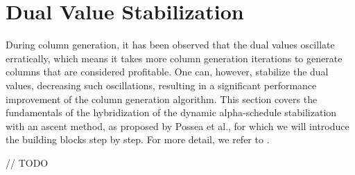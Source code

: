 \section{Dual Value Stabilization}\label{sec:cg_bp_dvs}
During column generation, it has been observed that the dual values oscillate erratically, which means it takes more column generation iterations to generate columns that are considered profitable. One can, however, stabilize the dual values, decreasing such oscillations, resulting in a significant performance improvement of the column generation algorithm. This section covers the fundamentals of the hybridization of the dynamic alpha-schedule stabilization with an ascent method, as proposed by Possea et al., for which we will introduce the building blocks step by step. For more detail, we refer to \cite{pessoa2013out,pessoa2018automation}.

// TODO